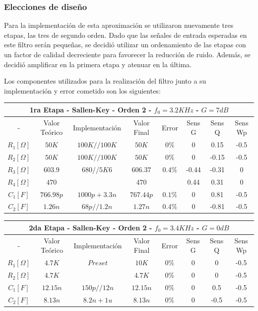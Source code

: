 \subsubsection{Elecciones de diseño}

Para la implementación de esta aproximación se utilizaron nuevamente tres etapas, las tres de segundo orden. Dado que las señales de entrada esperadas en este filtro serán pequeñas, se decidió utilizar un ordenamiento de las etapas con un factor de calidad decreciente para favorecer la reducción de ruido. Además, se decidió amplificar en la primera etapa y atenuar en la última.

Los componentes utilizados para la realización del filtro junto a su implementación y error cometido son los siguientes:

\begin{table}[H]
\centering
\begin{tabular}{@{}cccccccc@{}}
\multicolumn{8}{c}{1ra Etapa - Sallen-Key - Orden 2 - $f_0 = 3.2KHz$ - $G=7dB$} \\ \midrule
- & Valor Teórico & Implementación & Valor Final & Error & Sens G & Sens Q & Sens Wp \\ \midrule
$R_1 [\Omega]$ & $50K$ & $100K//100K$ & $50K$ & $0\%$ & 0 & 0.15 & -0.5 \\
$R_2 [\Omega]$ & $50K$ & $100K//100K$ & $50K$ & $0\%$ & 0 & -0.15 & -0.5 \\
$R_3 [\Omega]$ & $603.9$ & $680//5K6$ & $606.37$ & $0.4\%$ & -0.44 & -0.31 & 0 \\
$R_4 [\Omega]$ & $470$ &  & $470$ &  & 0.44 & 0.31 & 0 \\
$C_1 [F]$ & $766.98p$ & $1000p+3.3n$ & $767.44p$ & $0.1\%$ & 0 & 0.81 & -0.5 \\
$C_2 [F]$ & $1.26n$ & $68p//1.2n$ & $1.27n$ & $0.4\%$ & 0 & -0.81 & -0.5 \\ \bottomrule
\end{tabular}
\end{table}

\begin{table}[H]
\centering
\begin{tabular}{@{}cccccccc@{}}
\multicolumn{8}{c}{2da Etapa - Sallen-Key - Orden 2 - $f_0 = 3.4KHz$ - $G=0dB$} \\ \midrule
- & Valor Teórico & Implementación & Valor Final & Error & Sens G & Sens Q & Sens Wp \\ \midrule
$R_1 [\Omega]$ & $4.7K$ & $Preset$ & $10K$ & $0\%$ & 0 & 0 & -0.5 \\
$R_2 [\Omega]$ & $4.7K$ &  & $4.7K$ & $0\%$ & 0 & 0 & -0.5 \\
$C_1 [F]$ & $12.15n$ & $150p//12n$ & $12.15n$ & $0\%$ & 0 & 0.5 & -0.5 \\
$C_2 [F]$ & $8.13n$ & $8.2n+1u$ & $8.13n$ & $0\%$ & 0 & -0.5 & -0.5 \\ \bottomrule
\end{tabular}
\end{table}
 
